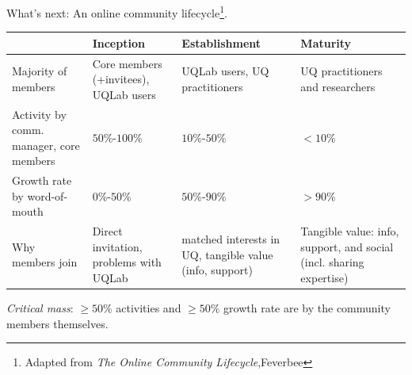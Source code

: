 \documentclass[]{rsuqbeamernew}
\begin{document}
\begin{frame}[t]{What's next: An online community lifecycle\footnote{Adapted from \emph{The Online Community Lifecycle},Feverbee}.}

\begin{tabularx}{\textwidth}{XXXX}
  \hline
                                    & Inception    & Establishment  & Maturity \\
  \hline
  \footnotesize{Majority of members}
  & Core members (+invitees), UQLab users
  & UQLab users, UQ practitioners
  & UQ practitioners and researchers  \\
  
  \footnotesize{Activity by comm. manager, core members}
  & $50$\%-$100$\%
  & $10$\%-$50$\% 
  & $<10$\% \\
  
  \footnotesize{Growth rate by word-of-mouth}
  & $0$\%-$50$\% 
  & $50$\%-$90$\%
  & $>90$\% \\
  
  \footnotesize{Why members join}
  & Direct invitation, problems with UQLab
  & matched interests in UQ, tangible value (info, support)
  & Tangible value: info, support, and social (incl. sharing expertise) \\
  \hline
\end{tabularx}

\vspace{0.35cm}

\emph{Critical mass}: $\geq 50\%$ activities and $\geq 50\%$ growth rate
are by the community members themselves.

\end{frame}
\end{document}
